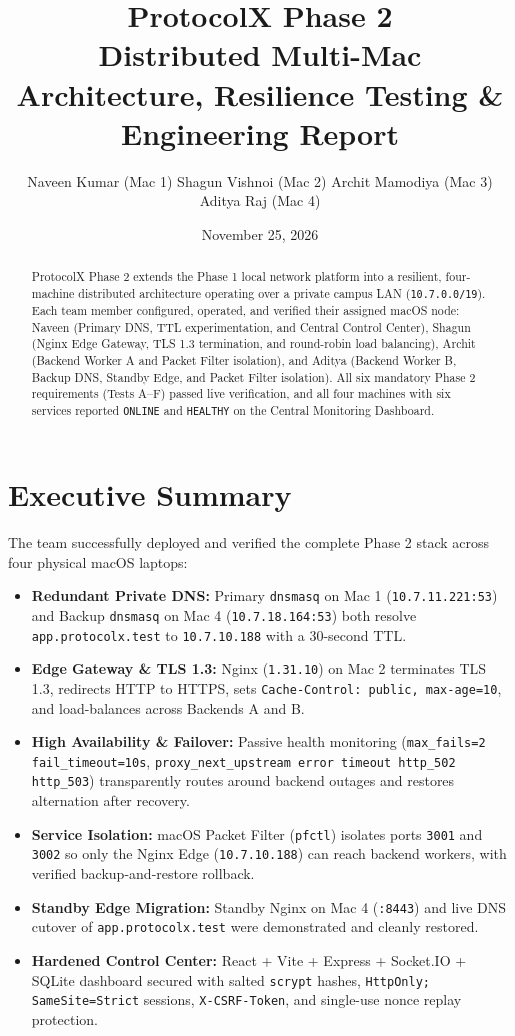 \documentclass[11pt,a4paper]{article}
\title{\textbf{ProtocolX Phase 2} \\ \large Distributed Multi-Mac Architecture, Resilience Testing \& Engineering Report}
\author{
    Naveen Kumar (Mac 1) \quad
    Shagun Vishnoi (Mac 2) \quad
    Archit Mamodiya (Mac 3) \quad
    Aditya Raj (Mac 4)
}
\date{November 25, 2026}
\begin{document}
\maketitle

\begin{abstract}
ProtocolX Phase 2 extends the Phase 1 local network platform into a resilient, four-machine distributed architecture operating over a private campus LAN (\texttt{10.7.0.0/19}). Each team member configured, operated, and verified their assigned macOS node: Naveen (Primary DNS, TTL experimentation, and Central Control Center), Shagun (Nginx Edge Gateway, TLS 1.3 termination, and round-robin load balancing), Archit (Backend Worker A and Packet Filter isolation), and Aditya (Backend Worker B, Backup DNS, Standby Edge, and Packet Filter isolation). All six mandatory Phase 2 requirements (Tests A--F) passed live verification, and all four machines with six services reported \texttt{ONLINE} and \texttt{HEALTHY} on the Central Monitoring Dashboard.
\end{abstract}

\section{Executive Summary}
The team successfully deployed and verified the complete Phase 2 stack across four physical macOS laptops:
\begin{itemize}[noitemsep]
    \item \textbf{Redundant Private DNS:} Primary \texttt{dnsmasq} on Mac 1 (\texttt{10.7.11.221:53}) and Backup \texttt{dnsmasq} on Mac 4 (\texttt{10.7.18.164:53}) both resolve \texttt{app.protocolx.test} to \texttt{10.7.10.188} with a 30-second TTL.
    \item \textbf{Edge Gateway \& TLS 1.3:} Nginx (\texttt{1.31.10}) on Mac 2 terminates TLS 1.3, redirects HTTP to HTTPS, sets \texttt{Cache-Control: public, max-age=10}, and load-balances across Backends A and B.
    \item \textbf{High Availability \& Failover:} Passive health monitoring (\texttt{max\_fails=2 fail\_timeout=10s}, \texttt{proxy\_next\_upstream error timeout http\_502 http\_503}) transparently routes around backend outages and restores alternation after recovery.
    \item \textbf{Service Isolation:} macOS Packet Filter (\texttt{pfctl}) isolates ports \texttt{3001} and \texttt{3002} so only the Nginx Edge (\texttt{10.7.10.188}) can reach backend workers, with verified backup-and-restore rollback.
    \item \textbf{Standby Edge Migration:} Standby Nginx on Mac 4 (\texttt{:8443}) and live DNS cutover of \texttt{app.protocolx.test} were demonstrated and cleanly restored.
    \item \textbf{Hardened Control Center:} React + Vite + Express + Socket.IO + SQLite dashboard secured with salted \texttt{scrypt} hashes, \texttt{HttpOnly; SameSite=Strict} sessions, \texttt{X-CSRF-Token}, and single-use nonce replay protection.
\end{itemize}
\end{document}
